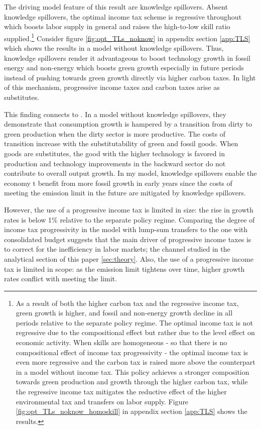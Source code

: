 The driving model feature of this result are knowledge spillovers. Absent knowledge spillovers, the optimal income tax scheme is regressive throughout which boosts labor supply in general and raises the high-to-low skill ratio supplied.\footnote{As a result of both the higher carbon tax and the regressive income tax, green growth is higher, and fossil and non-energy growth decline in all periods relative to the separate policy regime.  The optimal income tax is not regressive due to the compositional effect but rather due to the level effect on economic activity. When skills are homogeneous - so that there is no compositional effect of income tax progressivity - the optimal income tax is even more regressive and the carbon tax is raised more above the counterpart in a model without income tax. This policy achieves a stronger composition towards green production and growth through the higher carbon tax, while the regressive income tax mitigates the reductive effect of the higher environmental tax and transfers on labor supply. Figure \ref{fig:opt_TLs_noknow_homoskill} in appendix section \ref{app:TLS} shows the results.} Consider figure \ref{fig:opt_TLs_noknow} in appendix section \ref{app:TLS} which shows the results in a model without knowledge spillovers.
Thus, knowledge spillovers render it advantageous to boost technology growth in fossil energy and non-energy which boosts green growth especially in future periods instead of pushing towards green growth directly via higher carbon taxes. In light of this mechanism, progressive income taxes and carbon taxes arise as substitutes. 

This finding connects to \cite{Acemoglu2012TheChange}.  In a model without knowledge spillovers, they demonstrate that consumption growth is hampered by a transition from dirty to green production when the dirty sector is more productive. The costs of transition increase with the substitutability of green and fossil goods. When goods are substitutes, the good with the higher technology is favored in production and technology improvements in the backward sector do not contribute to overall output growth.
In my model, knowledge spillovers enable the economy t benefit from more fossil growth in early years since the costs of meeting the emission limit in the future are mitigated by knowledge spillovers. 

However, the use of a progressive income tax is limited in size: the rise in growth rates is below 1\% relative to the separate policy regime. Comparing the degree of income tax progressivity in the model with lump-sum transfers to the one with consolidated budget suggests that the main driver of progressive income taxes is to correct for the inefficiency in labor markets; the channel studied in the analytical section of this paper \ref{sec:theory}. 
Also, the use of a progressive income tax is limited in scope: as the emission limit tightens over time, higher growth rates conflict with meeting the limit. 

